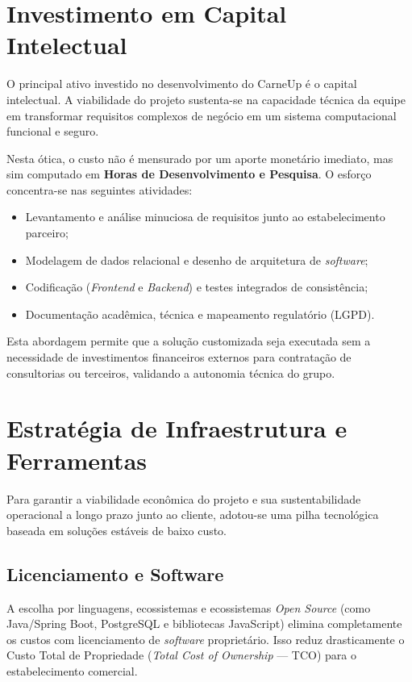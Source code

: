\documentclass[
	12pt,				%
	openany,			%
	oneside,			%
	a4paper,			%
	english,			%
	french,				%
	spanish,			%
	brazil				%
	]{abntex2}
\begin{document}
\section{Investimento em Capital Intelectual}

O principal ativo investido no desenvolvimento do CarneUp é o capital intelectual. A viabilidade do projeto sustenta-se na capacidade técnica da equipe em transformar requisitos complexos de negócio em um sistema computacional funcional e seguro.

Nesta ótica, o custo não é mensurado por um aporte monetário imediato, mas sim computado em \textbf{Horas de Desenvolvimento e Pesquisa}. O esforço concentra-se nas seguintes atividades:

\begin{itemize}
    \item Levantamento e análise minuciosa de requisitos junto ao estabelecimento parceiro;
    \item Modelagem de dados relacional e desenho de arquitetura de \textit{software};
    \item Codificação (\textit{Frontend} e \textit{Backend}) e testes integrados de consistência;
    \item Documentação acadêmica, técnica e mapeamento regulatório (LGPD).
\end{itemize}

Esta abordagem permite que a solução customizada seja executada sem a necessidade de investimentos financeiros externos para contratação de consultorias ou terceiros, validando a autonomia técnica do grupo.

\section{Estratégia de Infraestrutura e Ferramentas}

Para garantir a viabilidade econômica do projeto e sua sustentabilidade operacional a longo prazo junto ao cliente, adotou-se uma pilha tecnológica baseada em soluções estáveis de baixo custo.

\subsection{Licenciamento e Software}
A escolha por linguagens, ecossistemas e ecossistemas \textit{Open Source} (como Java/Spring Boot, PostgreSQL e bibliotecas JavaScript) elimina completamente os custos com licenciamento de \textit{software} proprietário. Isso reduz drasticamente o Custo Total de Propriedade (\textit{Total Cost of Ownership} --- TCO) para o estabelecimento comercial.
\end{document}
